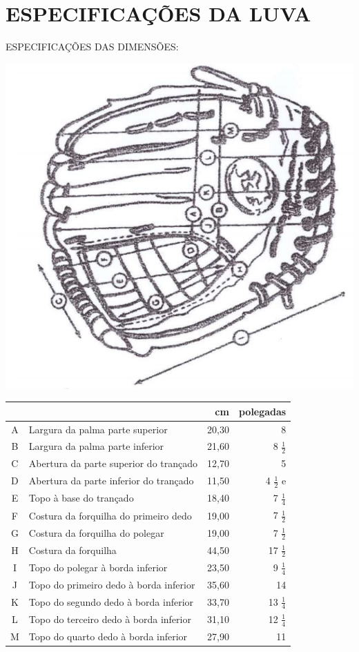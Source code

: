 \chapter{ESPECIFICAÇÕES DA LUVA} \label{chap:Luva}

ESPECIFICAÇÕES DAS DIMENSÕES: 

\begin{center}
	\includegraphics[width=.5\textwidth]{fig/Luva}
	
	
	\begin{tabular}{c |p{90mm}|r|r}
		&&cm& polegadas \\\hline\hline
		A& Largura da palma parte superior &20,30& 8  \\\hline
		B& Largura da palma parte inferior &21,60& 8 $\frac{1}{2}$ \\\hline 
		C& Abertura da parte superior do trançado &12,70 &5  \\\hline
		D& Abertura da parte inferior do trançado &11,50 &4 $\frac{1}{2}$  e\\\hline
		E& Topo à base do trançado &18,40& 7 $\frac{1}{4}$  \\\hline
		F& Costura da forquilha do primeiro dedo &19,00 &7 $\frac{1}{2}$  \\\hline
		G& Costura da forquilha do polegar &19,00& 7 $\frac{1}{2}$ \\\hline 
		H& Costura da forquilha &44,50& 17 $\frac{1}{2}$  \\\hline
		I& Topo do polegar à borda inferior &23,50 &9 $\frac{1}{4}$  \\\hline
		J& Topo do primeiro dedo à borda inferior &35,60 &14  \\\hline
		K& Topo do segundo dedo à borda inferior &33,70 &13 $\frac{1}{4}$  \\\hline
		L& Topo do terceiro dedo à borda inferior& 31,10& 12 $\frac{1}{4}$  \\\hline
		M& Topo do quarto dedo à borda inferior& 27,90 &11  \\\hline
	\end{tabular}  
\end{center}


